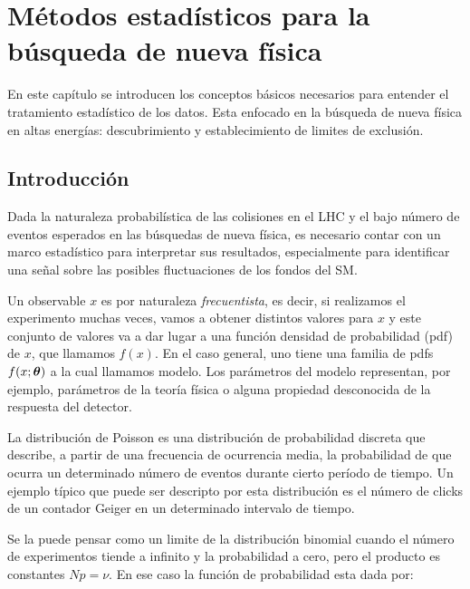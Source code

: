 \chapter{Métodos estadísticos para la búsqueda de nueva física}

En este capítulo se introducen los conceptos básicos necesarios para entender el
tratamiento estadístico de los datos. Esta enfocado en la búsqueda de nueva
física en altas energías: descubrimiento y establecimiento de limites de
exclusión.


\section{Introducción} %


Dada la naturaleza probabilística de las colisiones en el LHC y el bajo número
de eventos esperados en las búsquedas de nueva física, es necesario contar con
un marco estadístico para interpretar sus resultados, especialmente para
identificar una señal sobre las posibles fluctuaciones de los fondos del SM.

Un observable $x$ es por naturaleza \emph{frecuentista}, es decir, si realizamos
el experimento muchas veces, vamos a obtener distintos valores para $x$ y este
conjunto de valores va a dar lugar a una función densidad de probabilidad (pdf)
de $x$, que llamamos $f(x)$. En el caso general, uno tiene una familia de pdfs
$f(x;\bm{\theta})$ a la cual llamamos modelo. Los parámetros del modelo representan,
por ejemplo, parámetros de la teoría física o alguna propiedad desconocida de la
respuesta del detector.

La distribución de Poisson es una distribución de probabilidad discreta que
describe, a partir de una frecuencia de ocurrencia media, la probabilidad de que
ocurra un determinado número de eventos durante cierto período de tiempo. Un
ejemplo típico que puede ser descripto por esta distribución es el número de
clicks de un contador Geiger en un determinado intervalo de tiempo.


Se la puede pensar como un limite de la distribución binomial cuando el número
de experimentos tiende a infinito y la probabilidad a cero, pero el producto es
constantes $Np = \nu$. En ese caso la función de probabilidad esta dada por:

